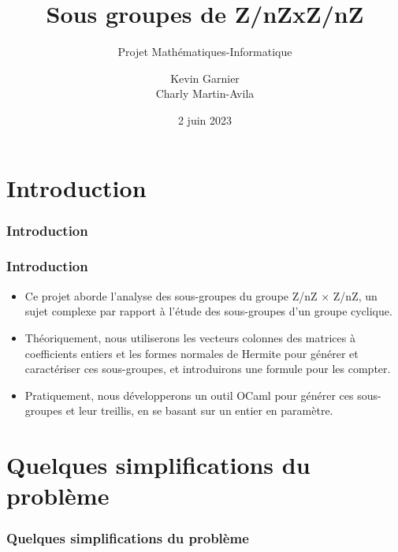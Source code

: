 \documentclass{beamer}
\begin{document}
\title{
    Sous groupes de Z/nZxZ/nZ
}
\subtitle{Projet Mathématiques-Informatique}
\author[Kevin, Charly]{
    Kevin Garnier \\    Charly Martin-Avila
}
\date{2 juin 2023}


\tableofcontents

\section{Introduction}
\begin{frame}
\frametitle{Introduction}
\tableofcontents[currentsection]
\end{frame}

\begin{frame}
\frametitle{Introduction}
\begin{itemize}
    \item Ce projet aborde l'analyse des sous-groupes du groupe Z/nZ × Z/nZ, un sujet complexe par rapport à l'étude des sous-groupes d'un groupe cyclique.
    \item Théoriquement, nous utiliserons les vecteurs colonnes des matrices à coefficients entiers et les formes normales de Hermite pour générer et caractériser ces sous-groupes, et introduirons une formule pour les compter.
    \item Pratiquement, nous développerons un outil OCaml pour générer ces sous-groupes et leur treillis, en se basant sur un entier en paramètre.
\end{itemize}
\end{frame}

\section{Quelques simplifications du problème}
\begin{frame}
\frametitle{Quelques simplifications du problème}
\tableofcontents[currentsection]
\end{frame}
\end{document}
